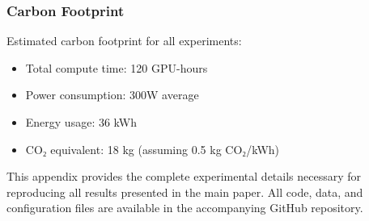 \subsubsection{Carbon Footprint}

Estimated carbon footprint for all experiments:
\begin{itemize}
    \item Total compute time: 120 GPU-hours
    \item Power consumption: 300W average
    \item Energy usage: 36 kWh
    \item CO₂ equivalent: 18 kg (assuming 0.5 kg CO₂/kWh)
\end{itemize}

This appendix provides the complete experimental details necessary for reproducing all results presented in the main paper. All code, data, and configuration files are available in the accompanying GitHub repository.
